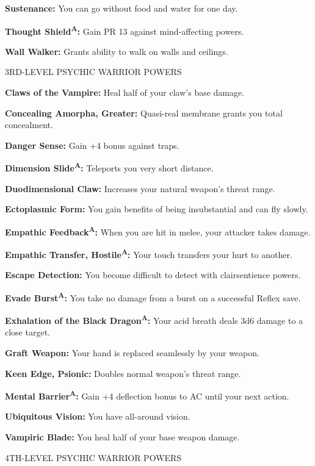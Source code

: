 \documentclass{article}
\begin{document}
\textbf{Sustenance: }You can go without food and water for one day.

\textbf{Thought Shield}\textsuperscript{\textbf{A}}\textbf{: }Gain PR 13 against 
mind-affecting powers.

\textbf{Wall Walker: }Grants ability to walk on walls and ceilings.

3RD-LEVEL PSYCHIC WARRIOR POWERS 

\textbf{Claws of the Vampire: }Heal half of your claw's base damage. 

\textbf{Concealing Amorpha, Greater: }Quasi-real membrane grants you total concealment.

\textbf{Danger Sense: }Gain +4 bonus against traps.

\textbf{Dimension Slide}\textsuperscript{\textbf{A}}\textbf{: }Teleports you very 
short distance.

\textbf{Duodimensional Claw: }Increases your natural weapon's threat range.

\textbf{Ectoplasmic Form: }You gain benefits of being insubstantial and can fly 
slowly.

\textbf{Empathic Feedback}\textsuperscript{\textbf{A}}\textbf{: }When you are hit 
in melee, your attacker takes damage.

\textbf{Empathic Transfer, Hostile}\textsuperscript{\textbf{A}}\textbf{: }Your 
touch transfers your hurt to another.

\textbf{Escape Detection: }You become difficult to detect with clairsentience powers.

\textbf{Evade Burst}\textsuperscript{\textbf{A}}\textbf{: }You take no damage from 
a burst on a successful Reflex save.

\textbf{Exhalation of the Black Dragon}\textsuperscript{\textbf{A}}\textbf{: }Your 
acid breath deals 3d6 damage to a close target.

\textbf{Graft Weapon: }Your hand is replaced seamlessly by your weapon.

\textbf{Keen Edge, Psionic: }Doubles normal weapon's threat range.

\textbf{Mental Barrier}\textsuperscript{\textbf{A}}\textbf{: }Gain +4 deflection 
bonus to AC until your next action.

\textbf{Ubiquitous Vision: }You have all-around vision. 

\textbf{Vampiric Blade: }You heal half of your base weapon damage.

4TH-LEVEL PSYCHIC WARRIOR POWERS 
\end{document}
